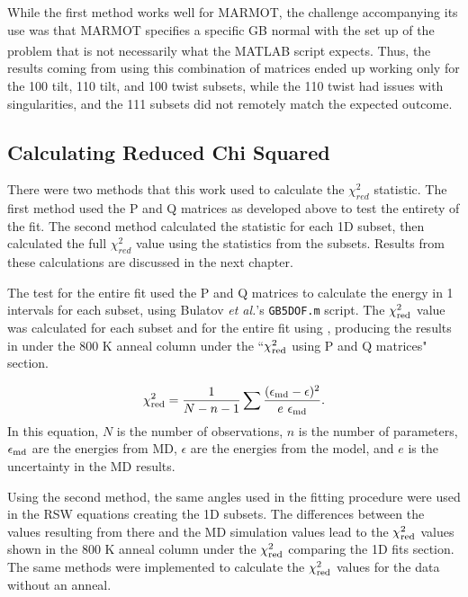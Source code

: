 \documentclass[12pt]{report}
\begin{document}
While the first method works well for MARMOT, the challenge accompanying its use was that MARMOT specifies a specific GB normal with the set up of the problem that is not necessarily what the MATLAB\textsuperscript{\textregistered} script expects.  Thus, the results coming from using this combination of matrices ended up working only for the \textlangle{}100\textrangle{} tilt, \textlangle{}110\textrangle{} tilt, and \textlangle{}100\textrangle{} twist subsets, while the \textlangle{}110\textrangle{} twist had issues with singularities, and the \textlangle{}111\textrangle{} subsets did not remotely match the expected outcome.

\subsection{Calculating Reduced Chi Squared\label{chi2:chi2red}}
There were two methods that this work used to calculate the $\chi^2_{red}$ statistic.  The first method used the P and Q matrices as developed above to test the entirety of the fit.  The second method calculated the statistic for each 1D subset, then calculated the full $\chi^2_{red}$ value using the statistics from the subsets.  Results from these calculations are discussed in the next chapter.

The test for the entire fit used the P and Q matrices to calculate the energy in 1\textdegree{} intervals for each subset, using Bulatov \emph{et al.}'s \lstinline!GB5DOF.m! script.  The $\chi_{\textnormal{red}}^2$ value was calculated for each subset and for the entire fit using , producing the results in  under the 800 K anneal column under the ``$\chi_{\textnormal{red}}^2$ using P and Q matrices" section.

\begin{equation}
\label{eq:chi2}
\chi^2_{\textnormal{red}} = \frac{1}{N-n-1} \sum \frac{(\epsilon_{\textnormal{md}} - \epsilon)^2}{e\ \epsilon_{\textnormal{md}}}.
\end{equation}
In this equation, $N$ is the number of observations, $n$ is the number of parameters, $\epsilon_{\textnormal{md}}$ are the energies from MD, $\epsilon$ are the energies from the model, and $e$ is the uncertainty in the MD results.

Using the second method, the same angles used in the fitting procedure were used in the RSW equations creating the 1D subsets.  The differences between the values resulting from there and the MD simulation values lead to the $\chi_{\textnormal{red}}^2$ values shown in the 800 K anneal column under the $\chi_{\textnormal{red}}^2$ comparing the 1D fits section.  The same methods were implemented to calculate the $\chi_{\textnormal{red}}^2$ values for the data without an anneal.
\end{document}
